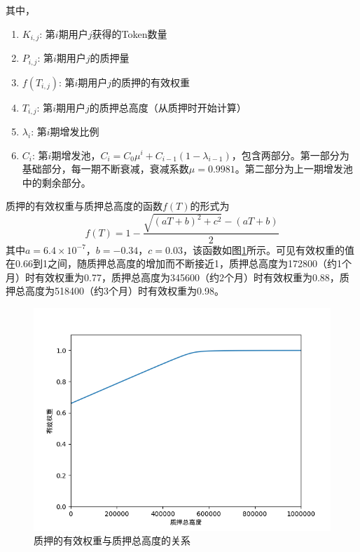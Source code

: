 其中，
\begin{enumerate}
   \item \(K_{i,j}\): 第\(i\)期用户\(j\)获得的Token数量
   \item \(P_{i,j}\): 第\(i\)期用户\(j\)的质押量
   \item \(f(T_{i,j})\): 第\(i\)期用户\(j\)的质押的有效权重
   \item \(T_{i,j}\): 第\(i\)期用户\(j\)的质押总高度（从质押时开始计算）
   \item \(\lambda_i\): 第\(i\)期增发比例
   \item \(C_i\): 第\(i\)期增发池，\(C_i = C_0 \mu^i + C_{i-1} (1-\lambda_{i-1})\)，包含两部分。第一部分为基础部分，每一期不断衰减，衰减系数$\mu=0.9981$。第二部分为上一期增发池中的剩余部分。
\end{enumerate}

质押的有效权重与质押总高度的函数\(f(T)\)的形式为
  \begin{equation}
    f(T) = 1 - \frac{\sqrt{(aT+b)^2+c^2}-(aT+b)}{2}
  \end{equation}
其中\(a=6.4\times10^{-7}\)，\(b=-0.34\)，\(c=0.03\)，该函数如图\ref{weight}所示。可见有效权重的值在0.66到1之间，随质押总高度的增加而不断接近1，质押总高度为172800（约1个月）时有效权重为0.77，质押总高度为345600（约2个月）时有效权重为0.88，质押总高度为518400（约3个月）时有效权重为0.98。
 \begin{figure}
   \centering
   \includegraphics[scale=0.4]{../common/weight.png}
   \caption{质押的有效权重与质押总高度的关系}\label{weight}
 \end{figure}

